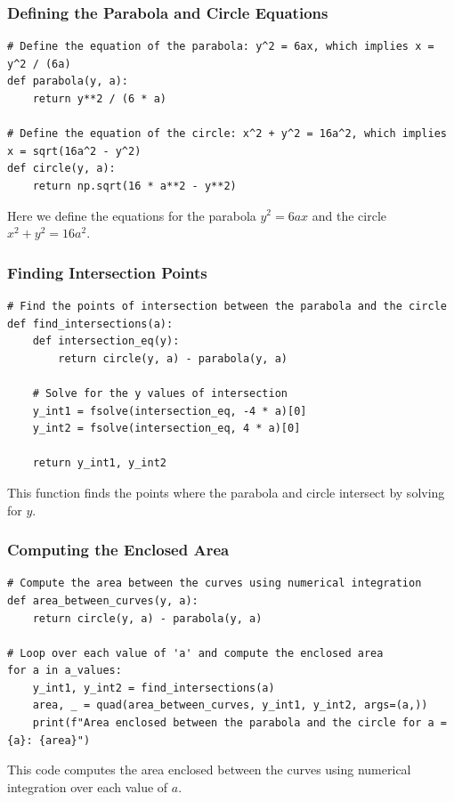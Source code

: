 \documentclass{beamer}
\begin{document}
\begin{frame}[fragile]
    \frametitle{Defining the Parabola and Circle Equations}

    \begin{lstlisting}
# Define the equation of the parabola: y^2 = 6ax, which implies x = y^2 / (6a)
def parabola(y, a):
    return y**2 / (6 * a)

# Define the equation of the circle: x^2 + y^2 = 16a^2, which implies x = sqrt(16a^2 - y^2)
def circle(y, a):
    return np.sqrt(16 * a**2 - y**2)
    \end{lstlisting}

    Here we define the equations for the parabola \( y^2 = 6ax \) and the circle \( x^2 + y^2 = 16a^2 \).
\end{frame}

\begin{frame}[fragile]
    \frametitle{Finding Intersection Points}

    \begin{lstlisting}
# Find the points of intersection between the parabola and the circle
def find_intersections(a):
    def intersection_eq(y):
        return circle(y, a) - parabola(y, a)
    
    # Solve for the y values of intersection
    y_int1 = fsolve(intersection_eq, -4 * a)[0]
    y_int2 = fsolve(intersection_eq, 4 * a)[0]

    return y_int1, y_int2
    \end{lstlisting}

    This function finds the points where the parabola and circle intersect by solving for \( y \).
\end{frame}

\begin{frame}[fragile]
    \frametitle{Computing the Enclosed Area}

    \begin{lstlisting}
# Compute the area between the curves using numerical integration
def area_between_curves(y, a):
    return circle(y, a) - parabola(y, a)

# Loop over each value of 'a' and compute the enclosed area
for a in a_values:
    y_int1, y_int2 = find_intersections(a)
    area, _ = quad(area_between_curves, y_int1, y_int2, args=(a,))
    print(f"Area enclosed between the parabola and the circle for a = {a}: {area}")
    \end{lstlisting}

    This code computes the area enclosed between the curves using numerical integration over each value of \( a \).
\end{frame}
\end{document}
